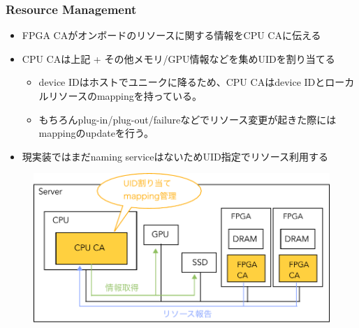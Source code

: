 \documentclass[dvipdfmx,9pt,notheorems]{beamer}
\theoremstyle{definition}
\begin{document}
\begin{frame}\frametitle{Resource Management}
	\begin{itemize}
		\item FPGA CAがオンボードのリソースに関する情報をCPU CAに伝える
		\item CPU CAは上記 + その他メモリ/GPU情報などを集めUIDを割り当てる
			\begin{itemize}
				\item device IDはホストでユニークに降るため、CPU CAはdevice IDとローカルリソースのmappingを持っている。
				\item もちろんplug-in/plug-out/failureなどでリソース変更が起きた際にはmappingのupdateを行う。
			\end{itemize}
		\item 現実装ではまだnaming serviceはないためUID指定でリソース利用する
	\end{itemize}
  \begin{figure}[htb]
		\includegraphics[scale=0.4]{fig/ez_DUA_ControlPlane_ResourceMangement.pdf}
  \end{figure}
\pnote{
}
\end{frame}
\end{document}
